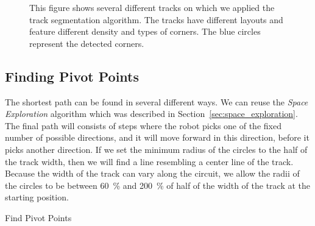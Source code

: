 \begin{figure}[]
	\label{fig:corner_detection}
	\caption{This figure shows several different tracks on which we applied the track segmentation algorithm. The tracks have different layouts and feature different density and types of corners. The blue circles represent the detected corners.}
\end{figure}


\subsection{Finding Pivot Points}
The shortest path can be found in several different ways. We can reuse the \textit{Space Exploration} algorithm which was described in Section~\ref{sec:space_exploration}. The final path will consists of steps where the robot picks one of the fixed number of possible directions, and it will move forward in this direction, before it picks another direction. If we set the minimum radius of the circles to the half of the track width, then we will find a line resembling a center line of the track. Because the width of the track can vary along the circuit, we allow the radii of the circles to be between \SI{60}{\percent} and \SI{200}{\percent} of half of the width of the track at the starting position.

\begin{algorithm}[]
	\caption{Find Pivot Points}
	\label{alg:find_pivots}
	
	\SetAlgoLined
	\DontPrintSemicolon
	
	
		
		
	\BlankLine
	

	\BlankLine

\end{algorithm}

